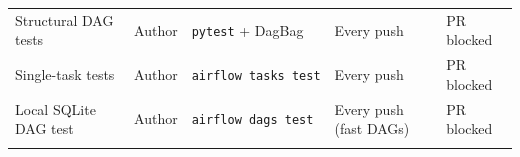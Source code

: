 \documentclass[
  11pt,
  british,
  oneside]{book}
\begin{document}
\begin{longtable}[]{@{}lllll@{}}
\begin{minipage}[t]{0.17\columnwidth}\raggedright
Structural DAG tests\strut
\end{minipage} & \begin{minipage}[t]{0.17\columnwidth}\raggedright
Author\strut
\end{minipage} & \begin{minipage}[t]{0.17\columnwidth}\raggedright
\texttt{pytest} + DagBag\strut
\end{minipage} & \begin{minipage}[t]{0.17\columnwidth}\raggedright
Every push\strut
\end{minipage} & \begin{minipage}[t]{0.17\columnwidth}\raggedright
PR blocked\strut
\end{minipage}\tabularnewline
\begin{minipage}[t]{0.17\columnwidth}\raggedright
Single-task tests\strut
\end{minipage} & \begin{minipage}[t]{0.17\columnwidth}\raggedright
Author\strut
\end{minipage} & \begin{minipage}[t]{0.17\columnwidth}\raggedright
\texttt{airflow\ tasks\ test}\strut
\end{minipage} & \begin{minipage}[t]{0.17\columnwidth}\raggedright
Every push\strut
\end{minipage} & \begin{minipage}[t]{0.17\columnwidth}\raggedright
PR blocked\strut
\end{minipage}\tabularnewline
\begin{minipage}[t]{0.17\columnwidth}\raggedright
Local SQLite DAG test\strut
\end{minipage} & \begin{minipage}[t]{0.17\columnwidth}\raggedright
Author\strut
\end{minipage} & \begin{minipage}[t]{0.17\columnwidth}\raggedright
\texttt{airflow\ dags\ test}\strut
\end{minipage} & \begin{minipage}[t]{0.17\columnwidth}\raggedright
Every push (fast DAGs)\strut
\end{minipage} & \begin{minipage}[t]{0.17\columnwidth}\raggedright
PR blocked\strut
\end{minipage}\tabularnewline
\begin{minipage}[t]{0.17\columnwidth}\raggedright

\end{minipage}
\end{longtable}
\end{document}
